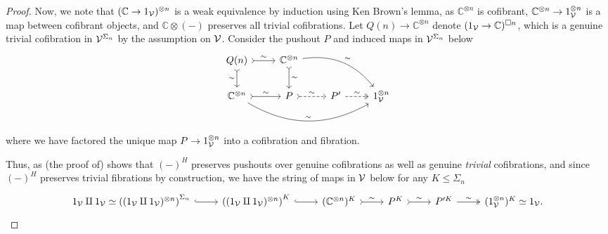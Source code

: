 \documentclass[a4paper,10pt
,draft
]{article}%
\renewcommand{\1}{\eta}%
\begin{document}
\begin{proof}
      Now,
      we note that $(\mathbb C \to 1_{\mathcal V})^{\otimes n}$ is a weak equivalence by induction using Ken Brown's lemma,
      as $\mathbb C^{\otimes n}$ is cofibrant,
      $\mathbb C^{\otimes n} \to 1_{\mathcal V}^{\otimes n}$ is a map between cofibrant objects,
      and $\mathbb C \otimes (-)$ preserves all trivial cofibrations.
      Let $Q(n) \to \mathbb C^{\otimes n}$ denote $(1_{\mathcal V} \to \mathbb C)^{\square n}$,
      which is a genuine trivial cofibration in $\mathcal V^{\Sigma_n}$ by the assumption on $\mathcal V$.
      Consider the pushout $P$ and induced maps in $\mathcal V^{\Sigma_n}$ below
      \begin{equation}
            \begin{tikzcd}
                  Q(n) \arrow[r, tail, "\sim"] \arrow[d, tail, "\sim"']
                  &
                  \mathbb C^{\otimes n} \arrow[d, tail, "\sim"] \arrow[drr, bend left, "\sim"]
                  \\
                  \mathbb C^{\otimes n} \arrow[r, tail, "\sim"] \arrow[rrr, bend right, "\sim"]
                  &
                  P \arrow[r, tail, dashed, "\sim"]
                  &
                  P' \arrow[r, two heads, "\sim", dashed]
                  &
                  1_\V^{\otimes n}
            \end{tikzcd}
      \end{equation}
      where we have factored the unique map $P \to 1_{\mathcal V}^{\otimes n}$ into a cofibration and fibration.

      Thus, as (the proof of) \cite[Prop 6.3]{BP_geo} shows that $(-)^H$ preserves pushouts over genuine cofibrations
      as well as genuine \textit{trivial} cofibrations,
      and since $(-)^H$ preserves trivial fibrations by construction,
      we have the string of maps in $\mathcal V$ below for any $K \leq \Sigma_n$
      \begin{equation}
            \begin{tikzcd}
                  1_\V \amalg 1_\V \simeq \left((1_\V \amalg 1_\V)^{\otimes n}\right)^{\Sigma_n} \arrow[r, hookrightarrow]
                  &
                  \left((1_\V \amalg 1_\V)^{\otimes n}\right)^K \arrow[r, hookrightarrow]
                  &
                  (\mathbb C^{\otimes n})^K \arrow[r, tail, "\sim"]
                  &
                  P^K \arrow[r, tail, "\sim"]
                  &
                  P'^K \arrow[r, two heads, "\sim"]
                  &
                  (1_\V^{\otimes n})^K \simeq 1_\V.
            \end{tikzcd}
      \end{equation}
\end{proof}
\end{document}
